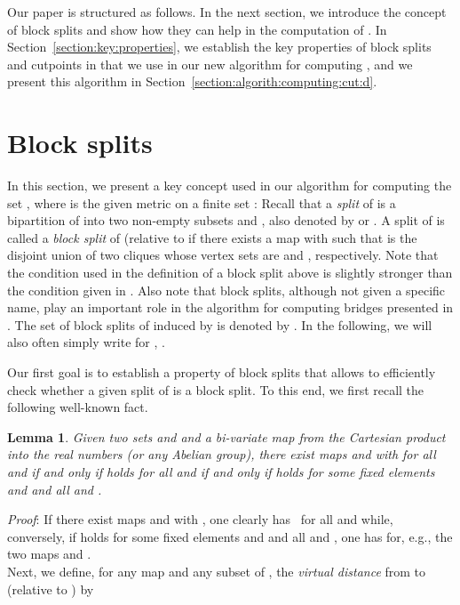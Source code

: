\documentclass[12pt]{article}
\newtheorem{lemma}[prop]{Lemma}
\begin{document}
Our paper is structured as follows. In the next section, we
introduce the concept of block splits and show how they can help in the computation
of . In Section~\ref{section:key:properties}, we establish the key properties
of block splits and cutpoints in  that we use in our new algorithm
for computing , and
we present this algorithm in Section~\ref{section:algorith:computing:cut:d}.


\section{Block splits}
\label{section:block:splits}


In this section, we present a key concept used
in our algorithm for computing the set ,
where  is the given metric on a finite set :
Recall that a \emph{split}  of  is a bipartition of 
into two non-empty subsets  and , also denoted by  or .
A split  of  is called a \emph{block split}
of  (relative to  if there exists a map 
 with 
such that  is the disjoint union of two cliques whose
vertex sets are  and , respectively. 
Note that the condition used in the definition of a block
split above is slightly stronger than the condition
given in \cite[p. 10]{imrich:optimal:realizations:1984}. Also note
that block splits, although not given a specific name,
play an important role in the algorithm for
computing bridges presented in \cite{hertz:varone:bridge:partition}.
The set of block splits of  induced by  is  denoted by . 
In the following, we will also often simply write 
 for , .

Our first goal is to establish a property of block splits
that allows to efficiently check whether a given split
of  is a block split. To this end, we first recall the 
following well-known fact.

\begin{lemma}
\label{lemma:bivariate:map}
Given two sets  and  and a bi-variate map  from the Cartesian product
 into the real numbers (or any Abelian group), there exist maps  and  with  for all  and  if and only if 
 holds for all  and  if and only if 
 holds for some fixed elements  and  and all  and .
\end{lemma}

\noindent\textsl{Proof}:
If  there exist maps  and  with , one clearly has  \ for all  and  while, conversely, if 
 holds for some fixed elements  and  and all  and , one has 
  for, e.g., the two maps  and 
. 
\hfill\\

Next, we define, for any map  and any subset  of , the \emph{virtual distance}  from  to  (relative to ) by
 
\end{document}

